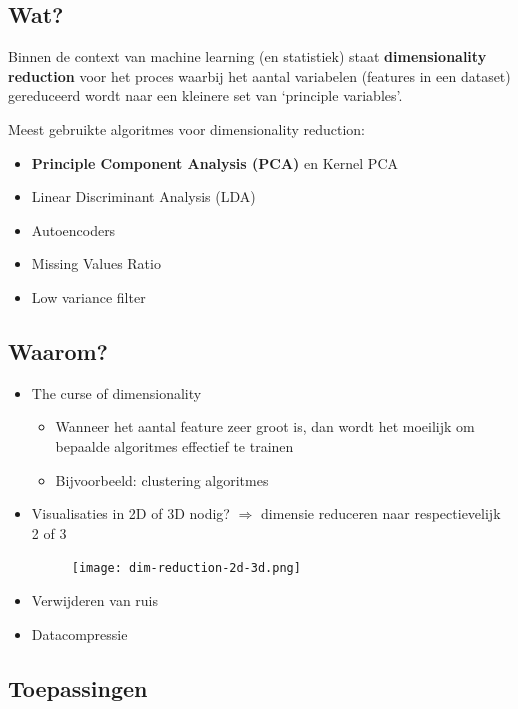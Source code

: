 \documentclass{article}
\begin{document}
\subsection{Wat?}

Binnen de context van machine learning (en statistiek) staat \textbf{dimensionality reduction} voor
het proces waarbij het aantal variabelen (features in een dataset) gereduceerd wordt naar een
kleinere set van `principle variables'.

Meest gebruikte algoritmes voor dimensionality reduction:

\begin{itemize}
    \item \textbf{Principle Component Analysis (PCA)} en Kernel PCA
    \item Linear Discriminant Analysis (LDA)
    \item Autoencoders
    \item Missing Values Ratio
    \item Low variance filter
\end{itemize}

\subsection{Waarom?}

\begin{itemize}
    \item The curse of dimensionality
    \begin{itemize}
        \item Wanneer het aantal feature zeer groot is, dan wordt het moeilijk om bepaalde algoritmes effectief te trainen
        \item Bijvoorbeeld: clustering algoritmes
    \end{itemize}
    \item Visualisaties in 2D of 3D nodig? $\Rightarrow$ dimensie reduceren naar respectievelijk 2 of 3
    \begin{figure}[H]
        \centering
        \texttt{[image: dim-reduction-2d-3d.png]}
    \end{figure}
    
    \item Verwijderen van ruis
    \item Datacompressie
\end{itemize}

\subsection{Toepassingen}
\end{document}

